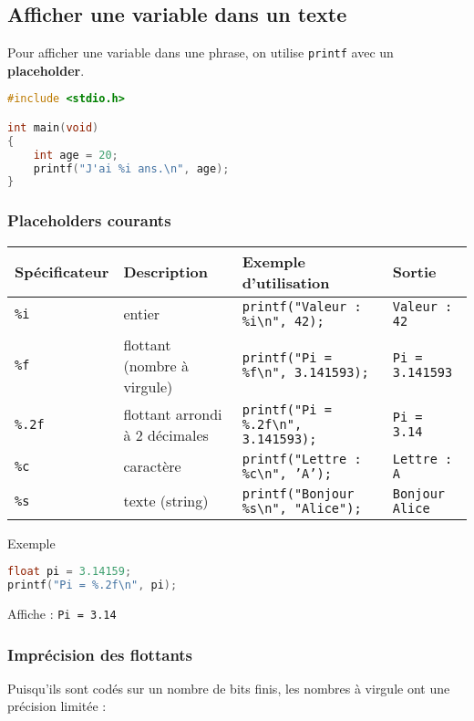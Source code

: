 \subsection{Afficher une variable dans un texte}
Pour afficher une variable dans une phrase, on utilise \texttt{printf} avec un \textbf{placeholder}.

\begin{lstlisting}[language=c]
#include <stdio.h>

int main(void)
{
    int age = 20;
    printf("J'ai %i ans.\n", age);
}
\end{lstlisting}


\subsubsection{Placeholders courants}

\begin{center}
	\begin{tabular}{|l|l|l|l|}
		\hline
		Spécificateur  & Description                    & Exemple d'utilisation                                    & Sortie                 \\
		\hline
		\texttt{\%i}   & entier                         & \texttt{printf("Valeur : \%i\textbackslash n", 42);}     & \texttt{Valeur : 42}   \\
		\texttt{\%f}   & flottant (nombre à virgule)    & \texttt{printf("Pi = \%f\textbackslash n", 3.141593);}   & \texttt{Pi = 3.141593} \\
		\texttt{\%.2f} & flottant arrondi à 2 décimales & \texttt{printf("Pi = \%.2f\textbackslash n", 3.141593);} & \texttt{Pi = 3.14}     \\
		\texttt{\%c}   & caractère                      & \texttt{printf("Lettre : \%c\textbackslash n", 'A');}    & \texttt{Lettre : A}    \\
		\texttt{\%s}   & texte (string)                 & \texttt{printf("Bonjour \%s\textbackslash n", "Alice");} & \texttt{Bonjour Alice} \\
		\hline
	\end{tabular}
\end{center}
\begin{UPSTIinfor}{Exemple}
	\begin{lstlisting}[language=c]
float pi = 3.14159;
printf("Pi = %.2f\n", pi);
\end{lstlisting}
	Affiche : \texttt{Pi = 3.14}
\end{UPSTIinfor}


\subsubsection{Imprécision des flottants}
Puisqu'ils sont codés sur un nombre de bits finis, les nombres à virgule ont une précision limitée :

